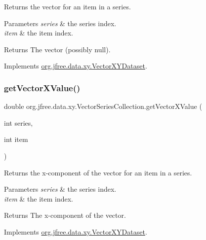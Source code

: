 Returns the vector for an item in a series.


\begin{DoxyParams}{Parameters}
{\em series} & the series index. \\
\hline
{\em item} & the item index.\\
\hline
\end{DoxyParams}
\begin{DoxyReturn}{Returns}
The vector (possibly {\ttfamily null}). 
\end{DoxyReturn}


Implements \mbox{\hyperlink{interfaceorg_1_1jfree_1_1data_1_1xy_1_1_vector_x_y_dataset_aba926f9aaf6a756befe095ac4b84de0e}{org.\+jfree.\+data.\+xy.\+Vector\+X\+Y\+Dataset}}.

\mbox{\label{classorg_1_1jfree_1_1data_1_1xy_1_1_vector_series_collection_acb84437fda51302c4a5b8a300cd812fb}} 
\subsubsection{\texorpdfstring{get\+Vector\+X\+Value()}{getVectorXValue()}}
{\footnotesize\ttfamily double org.\+jfree.\+data.\+xy.\+Vector\+Series\+Collection.\+get\+Vector\+X\+Value (\begin{DoxyParamCaption}\item[{int}]{series,  }\item[{int}]{item }\end{DoxyParamCaption})}

Returns the x-\/component of the vector for an item in a series.


\begin{DoxyParams}{Parameters}
{\em series} & the series index. \\
\hline
{\em item} & the item index.\\
\hline
\end{DoxyParams}
\begin{DoxyReturn}{Returns}
The x-\/component of the vector. 
\end{DoxyReturn}


Implements \mbox{\hyperlink{interfaceorg_1_1jfree_1_1data_1_1xy_1_1_vector_x_y_dataset_a1126d5960a9f446d360f89715d93d209}{org.\+jfree.\+data.\+xy.\+Vector\+X\+Y\+Dataset}}.

